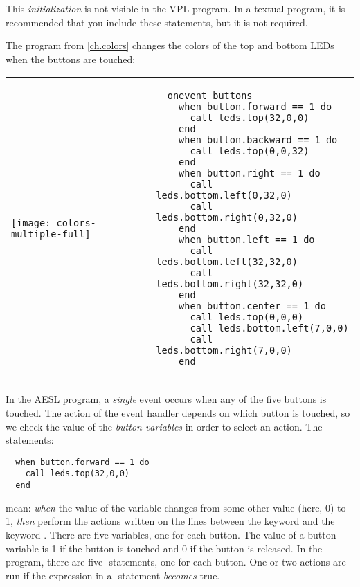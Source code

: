 This \emph{initialization} is not visible in the VPL program. In a
textual program, it is recommended that you include these statements,
but it is not required.

\newpage


The program  from \cref{ch.colors} changes the
colors of the top and bottom LEDs when the buttons are touched:

\begin{center}
\begin{tabular}{ll}
\texttt{[image: colors-multiple-full]} &
\begin{minipage}[b]{.5\textwidth}
\begin{footnotesize}
\begin{verbatim}
  onevent buttons
    when button.forward == 1 do
      call leds.top(32,0,0)
    end
    when button.backward == 1 do
      call leds.top(0,0,32)
    end
    when button.right == 1 do
      call leds.bottom.left(0,32,0)
      call leds.bottom.right(0,32,0)
    end
    when button.left == 1 do
      call leds.bottom.left(32,32,0)
      call leds.bottom.right(32,32,0)
    end
    when button.center == 1 do
      call leds.top(0,0,0)
      call leds.bottom.left(7,0,0)
      call leds.bottom.right(7,0,0)
    end
\end{verbatim}
\end{footnotesize}
\vspace*{5ex}
\end{minipage}
\end{tabular}
\end{center}

In the AESL program, a \emph{single} event occurs when any of the five
buttons is touched. The action of the event handler 
depends on which button is touched, so we check the value of the
\emph{button variables} in order to select an action. The statements:

\begin{footnotesize}
\begin{verbatim}
  when button.forward == 1 do
    call leds.top(32,0,0)
  end
\end{verbatim}
\end{footnotesize}

mean: \emph{when} the value of the variable  changes
from some other value (here, 0) to 1, \emph{then} perform the actions
written on the lines between the keyword  and the keyword .
There are five  variables, one for each button. The value of a
button variable is 1 if the button is touched and 0 if the button is
released. In the program, there are five -statements, one for
each button. One or two actions are run if the expression in a
-statement \emph{becomes} true.

